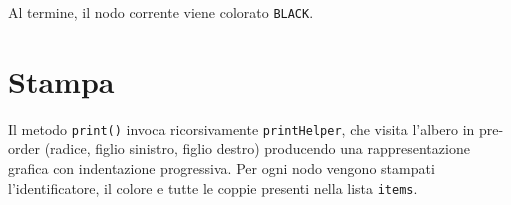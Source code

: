 Al termine, il nodo corrente viene colorato \texttt{BLACK}.

\section{Stampa}

Il metodo \texttt{print()} invoca ricorsivamente \texttt{printHelper}, che 
visita l'albero in pre-order (radice, figlio sinistro, figlio destro) 
producendo una rappresentazione grafica con indentazione progressiva. 
Per ogni nodo vengono stampati l'identificatore, il colore e tutte le 
coppie presenti nella lista \texttt{items}.